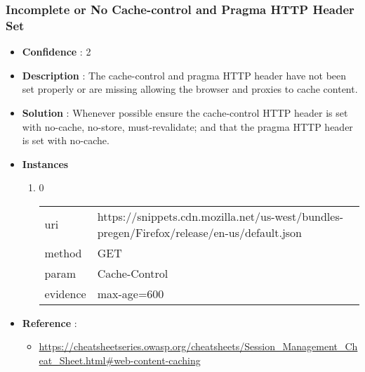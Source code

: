 \documentclass[10pt]{article}
\begin{document}
\subsubsection{Incomplete or No Cache-control and Pragma HTTP Header Set}
\begin{itemize}
\item[] \textbf{Confidence} : 2
\item[] \textbf{Description} : The cache-control and pragma HTTP header have not been set properly or are missing allowing the browser and proxies to cache content.
\item[] \textbf{Solution} :  Whenever possible ensure the cache-control HTTP header is set with no-cache, no-store, must-revalidate; and that the pragma HTTP header is set with no-cache.
\item[] \textbf{Instances}
\begin{enumerate}
\item[] 0
\begin{tabular}{| l | p{12cm}}
uri & https://snippets.cdn.mozilla.net/us-west/bundles-pregen/Firefox/release/en-us/default.json \\
method & GET \\
param & Cache-Control \\
evidence & max-age=600 \\
\end{tabular}
\end{enumerate}
\item[] \textbf{Reference} : 
\begin{itemize}
\item \url{https://cheatsheetseries.owasp.org/cheatsheets/Session\_Management\_Cheat\_Sheet.html\#web-content-caching}
\end{itemize}
\end{itemize}
\end{document}
